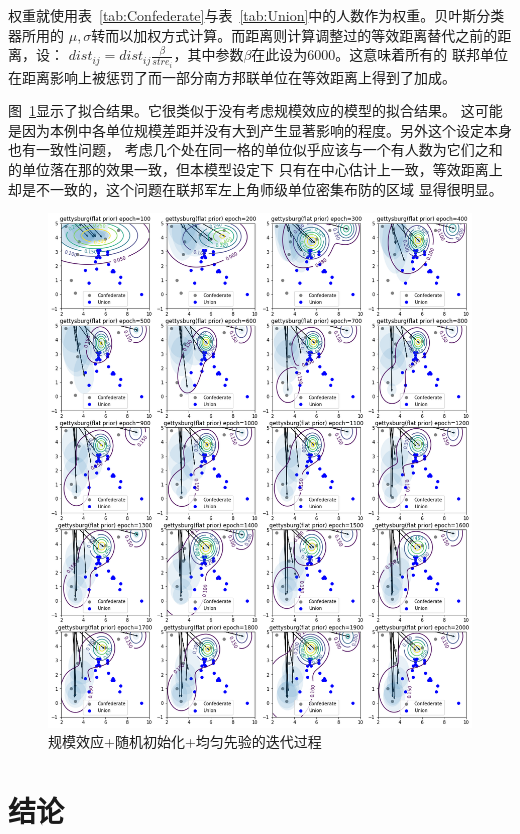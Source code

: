 \documentclass{sicnuthesis}
\begin{document}
权重就使用表~\ref{tab:Confederate}与表~\ref{tab:Union}中的人数作为权重。贝叶斯分类器所用的
$\mu,\sigma$转而以加权方式计算。而距离则计算调整过的等效距离替代之前的距离，设：
$dist_{ij} = dist_{ij} \frac{\beta}{stre_i}$，其中参数$\beta$在此设为$6000$。这意味着所有的
联邦单位在距离影响上被惩罚了而一部分南方邦联单位在等效距离上得到了加成。

图~\ref{fig:gettysburgInitTwo}显示了拟合结果。它很类似于没有考虑规模效应的模型的拟合结果。
这可能是因为本例中各单位规模差距并没有大到产生显著影响的程度。另外这个设定本身也有一致性问题，
考虑几个处在同一格的单位似乎应该与一个有人数为它们之和的单位落在那的效果一致，但本模型设定下
只有在中心估计上一致，等效距离上却是不一致的，这个问题在联邦军左上角师级单位密集布防的区域
显得很明显。

\begin{figure}[htb]
\includegraphics[width=0.99\linewidth]{gettysburg-init2.png}
\caption{
规模效应+随机初始化+均匀先验的迭代过程}
\label{fig:gettysburgInitTwo}
\end{figure}

\clearpage
\section{结论}
\end{document}
